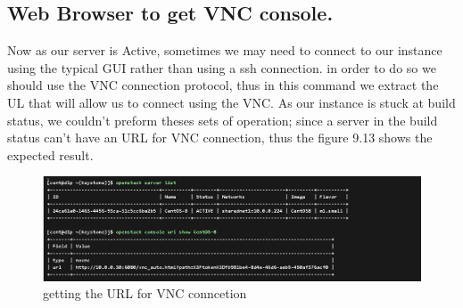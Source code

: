 \begin{spacing}{1.2}
\section{Web Browser to get VNC console.}
\par Now as our server is Active, sometimes we may need to connect to our instance using the typical GUI rather than using a ssh connection. in order to do so we should use the VNC connection protocol, thus in this command we extract the UL that will allow us to connect using the VNC. As our instance is stuck at build status, we couldn't preform theses sets of operation; since a server in the build status can't have an URL for VNC connection, thus the figure 9.13 shows the expected result. 
\\
\begin{figure}[!htb] 
\begin{center} 
\includegraphics[width=1\linewidth]{Cloud/Creating and Running Instances/C_4_expected_result_since our server us stuck at building process we can't do theses manipulation .png} 
\end{center} 
\caption{getting the URL for VNC conncetion} 
\end{figure} 
\FloatBarrier
\\

\\
\\


\end{spacing}
